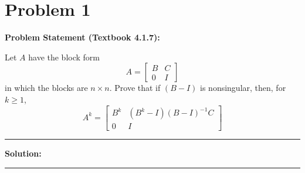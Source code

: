 \clearpage
\section*{Problem 1}

\textbf{Problem Statement (Textbook 4.1.7):} 

Let $A$ have the block form
$$A = \begin{bmatrix} B & C \\ 0 & I \end{bmatrix}$$
in which the blocks are $n \times n$. Prove that if $(B - I)$ is nonsingular, then, for $k \geq 1$,
$$A^k = \begin{bmatrix} B^k & (B^k - I)(B - I)^{-1}C \\ 0 & I \end{bmatrix}$$

\noindent\rule{\textwidth}{0.4pt}

\vspace{1em}

\textbf{Solution:}


\vspace{2em}
\noindent\rule{\textwidth}{0.4pt}
